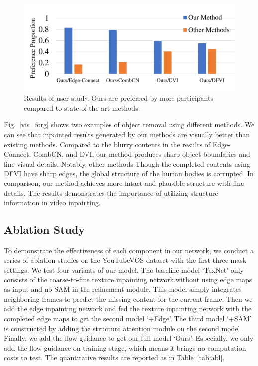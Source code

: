 \begin{figure}[!t]
	\centering
	\includegraphics[width=1.0\columnwidth]{userstudy} %
	\caption{Results of user study. Ours are preferred by more participants compared to state-of-the-art methods.}
	\label{userstudy}
\end{figure}
%

Fig.~\ref{vis_forg} shows two examples of object removal using different methods. 
We can see that inpainted results generated by our methods are visually better than existing methods.
Compared to the blurry contents in the results of Edge-Connect, CombCN, and DVI, our method produces sharp object boundaries and fine visual details. Notably, other methods 
Though the completed contents using DFVI have sharp edges, the global structure of the human bodies is corrupted. In comparison, our method achieves more intact and plausible structure with fine details.
The results demonstrates the importance of utilizing structure information in video inpainting. 




\subsection{Ablation Study}
To demonstrate the effectiveness of each component in our network, we conduct a series of ablation studies on the YouTubeVOS dataset with the first three mask settings. 
%
We test four variants of our model. 
The baseline model `TexNet' only consists of the coarse-to-fine texture inpainting network without using edge maps as input and no SAM in the refinement module.
This model simply integrates neighboring frames to predict the missing content for the current frame.
%
Then we add the edge inpainting network and fed the texture inpainting network with the completed edge maps to get the second model `+Edge'.
The third model `+SAM' is constructed by adding the structure attention module on the second model. 
Finally, we add the flow guidance to get our full model `Ours'. Especially, we only add the flow guidance on training stage, which means it brings no computation costs to test.
The quantitative results are reported as in Table~\ref{tab:abl}. 


